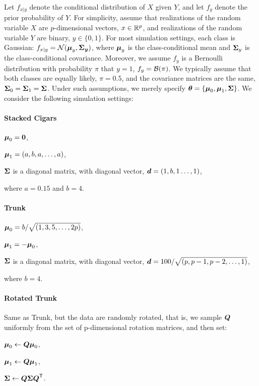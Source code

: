 \documentclass[11pt]{extarticle}
\begin{document}
Let $f_{x|y}$ denote the conditional distribution of $X$ given $Y$, and let $f_y$ denote the prior probability of $Y$.  For simplicity, assume that realizations of the random variable $X$ are $p$-dimensional vectors,  $x \in \mathbb{R}^p$, and realizations of the random variable $Y$ are binary, $y \in \{0,1\}$.
For most simulation settings, each class is Gaussian:
$f_{x|y} = \mathcal{N}(\boldsymbol{\mu}_y,\boldsymbol{\Sigma_y})$, where $\boldsymbol{\mu}_y$ is the class-conditional mean and $\boldsymbol{\Sigma}_y$ is the class-conditional covariance.  Moreover, we assume $f_y$ is a Bernoulli distribution with probability $\pi$ that $y=1$, $f_y = \mathcal{B}(\pi)$.
We typically assume that both classes are equally likely, $\pi=0.5$, and the covariance matrices are the same, $\boldsymbol{\Sigma}_0=\boldsymbol{\Sigma}_1=\boldsymbol{\Sigma}$. Under such assumptions, we merely specify $\boldsymbol{\theta}=\{\boldsymbol{\mu}_0,\boldsymbol{\mu}_1, \boldsymbol{\Sigma}\}$. We consider the following simulation settings:


\paragraph*{Stacked Cigars}
\begin{compactitem}
\item $\boldsymbol{\mu}_0=\boldsymbol{0}$,
\item $\boldsymbol{\mu}_1=(a, b, a, \ldots, a)$,
\item $\boldsymbol{\Sigma}$ is a diagonal matrix, with diagonal vector, $\boldsymbol{d}=(1,b,1\ldots,1)$,
\end{compactitem}
where $a=0.15$ and $b=4$.


\paragraph*{Trunk}
\begin{compactitem}
\item $\boldsymbol{\mu}_0=b/\sqrt{(1, 3, 5, \ldots, 2p)}$,
\item $\boldsymbol{\mu}_1=-\boldsymbol{\mu}_0$,
\item $\boldsymbol{\Sigma}$ is a diagonal matrix, with diagonal vector, $\boldsymbol{d}=100/\sqrt{(p, p-1, p-2, \ldots, 1)}$,
\end{compactitem}
where $b=4$.



\paragraph*{Rotated Trunk} Same as Trunk, but the data are randomly rotated, that is, we sample $\boldsymbol{Q}$ uniformly from the set of p-dimensional rotation matrices, and then set:
\begin{compactitem}
\item $\boldsymbol{\mu}_0 \leftarrow \boldsymbol{Q} \boldsymbol{\mu}_0$,
\item $\boldsymbol{\mu}_1 \leftarrow \boldsymbol{Q} \boldsymbol{\mu}_1$,
\item $\boldsymbol{\Sigma} \leftarrow \boldsymbol{Q} \boldsymbol{\Sigma} \boldsymbol{Q}^{\mathsf{T}}$.
\end{compactitem}
\end{document}
